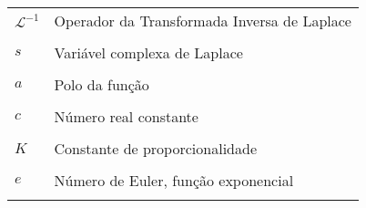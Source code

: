 \begin{longtable}[l]{p{50pt} p{300pt}}
  $\mathscr{L}^{-1}$ & Operador da Transformada Inversa de Laplace\\ \\
  $s$ & Variável complexa de Laplace\\ \\
  $a$ & Polo da função \\ \\
  $c$ & Número real constante\\ \\
  $K$ & Constante de proporcionalidade\\ \\
  $e$ & Número de Euler, função exponencial\\ \\
  
\end{longtable}
